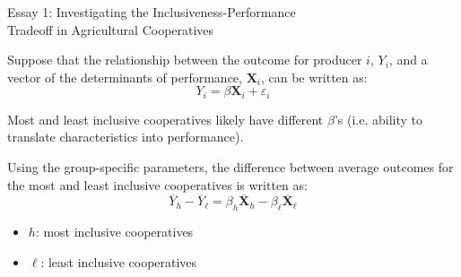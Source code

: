 \documentclass[aspectratio=169]{beamer}
\newenvironment{wideitemize}{\itemize\addtolength{\itemsep}{10pt}}{\enditemize}
\begin{document}
\begin{frame}{Essay 1: Investigating the Inclusiveness-Performance \\ \hspace{1.7cm} Tradeoff in Agricultural Cooperatives}
    \begin{wideitemize}
        \item Suppose that the relationship between the outcome for producer $i$, $Y_i$, and a vector of the determinants of performance, $\mathbf{X}_i$, can be written as: \vspace{.25cm}
            \begin{equation} \label{eq:E1_1}
                Y_i = \beta \mathbf{X}_i + \varepsilon_i 
            \end{equation} 
        \item Most and least inclusive cooperatives likely have different $\beta$'s (i.e. ability to translate characteristics into performance). 
        \item Using the group-specific parameters, the difference between average outcomes for the most and least inclusive cooperatives is written as: \vspace{.25cm}
            \begin{equation} \label{eq:E1_2}
                \overline{Y}_{h} - \overline{Y}_{\ell} =  \beta_{h}\overline{\mathbf{X}}_{h} - \beta_{\ell}\overline{\mathbf{X}}_{\ell}
            \end{equation}  
            \begin{itemize}
                \item $h$: most inclusive cooperatives
                \item $\ell$: least inclusive cooperatives 
            \end{itemize}
    \end{wideitemize}
\end{frame}
\end{document}
